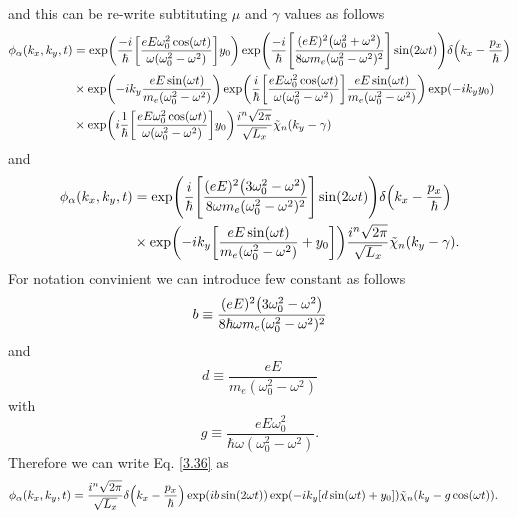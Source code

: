 and this can be re-write subtituting $\mu$ and $\gamma$ values as follows
\begin{equation} \label{3.35}
  \begin{aligned}
    \phi_{\alpha}(k_x,k_y,t) & =
    \exp(
      \frac{-i}{\hbar}
      \qty[
      \frac{eE\omega_0^2\cos(\omega t)}{\omega(\omega_0^2 - \omega^2)}]y_0
    )
    \exp(
      \frac{-i}{\hbar}
      \qty[
      \frac{(eE)^2\qty(\omega_0^2 + \omega^2)}{8\omega m_e(\omega_0^2 - \omega^2)^2}
      ]\sin(2\omega t)
    )
    \delta\qty(k_x -\frac{p_x}{\hbar})\\
    & \times
    \exp(
      -ik_y  \frac{eE\sin(\omega t)}{m_e(\omega_0^2 - \omega^2)}
    )
    \exp(
      \frac{i}{\hbar}
      \qty[ \frac{eE\omega_0^2\cos(\omega t)}{\omega(\omega_0^2 - \omega^2)}]
      \frac{eE\sin(\omega t)}{m_e(\omega_0^2 - \omega^2)}
    )
    \exp(
      -i k_y y_0
    ) \\
    & \times
    \exp(
      i \frac{1}{\hbar}
      \qty[ \frac{eE\omega_0^2\cos(\omega t)}{\omega(\omega_0^2 - \omega^2)}]
      y_0
    )
    \frac{i^n\sqrt{2\pi}}{\sqrt{L_x}}
    \tilde{\chi}_{n}\qty(k_y -\gamma)
  \end{aligned}
\end{equation}
and
\begin{equation} \label{3.36}
  \begin{aligned}
    \phi_{\alpha}(k_x,k_y,t) & =
    \exp(
      \frac{i}{\hbar}
      \qty[
      \frac{(eE)^2\qty(3\omega_0^2 - \omega^2)}{8\omega m_e(\omega_0^2 - \omega^2)^2}
      ]\sin(2\omega t)
    )
    \delta\qty(k_x -\frac{p_x}{\hbar})\\
    & \times
    \exp(
      -ik_y  \qty[\frac{eE\sin(\omega t)}{m_e(\omega_0^2 - \omega^2)} + y_0]
    )
    \frac{i^n\sqrt{2\pi}}{\sqrt{L_x}}
    \tilde{\chi}_{n}\qty(k_y -\gamma).
  \end{aligned}
\end{equation}
For notation convinient we can introduce few constant as follows
\begin{equation} \label{3.37}
  b \equiv
  \frac{(eE)^2\qty(3\omega_0^2 - \omega^2)}{8\hbar \omega m_e(\omega_0^2 - \omega^2)^2}
\end{equation}
and
\begin{equation} \label{3.38}
  d \equiv
  \frac{eE}{m_e(\omega_0^2 - \omega^2)}
\end{equation}
with
\begin{equation} \label{3.39}
  g \equiv
  \frac{eE\omega_0^2}{\hbar\omega(\omega_0^2 - \omega^2)}.
\end{equation}
Therefore we can write Eq. \eqref{3.36} as
\begin{equation} \label{3.40}
  \begin{aligned}
    \phi_{\alpha}(k_x,k_y,t) & =
    \frac{i^n\sqrt{2\pi}}{\sqrt{L_x}}
    \delta\qty(k_x -\frac{p_x}{\hbar})
    \exp(
      ib\sin(2\omega t)
    )
    \exp(
      -ik_y  \qty[d\sin(\omega t) + y_0]
    )
    \tilde{\chi}_{n}\qty(k_y -g\cos(\omega t)).
  \end{aligned}
\end{equation}
